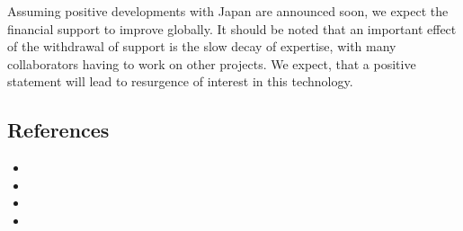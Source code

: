Assuming positive developments with Japan are announced soon, we expect the financial support to improve globally. It should be noted that
an important effect of the withdrawal of support is the slow decay of expertise, with many collaborators having to work on other projects. We expect, that 
a positive statement will lead to resurgence of interest in this technology.

\subsection{References}

\begin{itemize}
\item {}
\item {}
\item {}
\item {}
\end{itemize}
